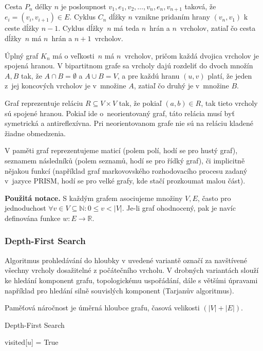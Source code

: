 Cesta $P_n$ délky $n$ je posloupnost $v_1,e_1,v_2,\ldots,v_n,e_n,v_{n+1}$ 
taková, že $e_i = (v_i, v_{i+1}) \in E$. Cyklus $C_n$ dĺžky $n$ vznikne
pridaním hrany $(v_n, v_1)$ k ceste dĺžky $n-1$. Cyklus dĺžky~$n$ má 
teda $n$~hrán a $n$~vrcholov, zatiaľ čo cesta dĺžky~$n$ má $n$~hrán a $n+1$~vrcholov.

Úplný graf $K_n$ má o veľkosti~$n$ má $n$~vrcholov, pričom každá dvojica
vrcholov je spojená hranou. V bipartitnom grafe sa vrcholy dajú
rozdeliť do dvoch množín $A,B$ tak, že $A \cap B = \emptyset$ a 
$A \cup B = V$, a pre každú hranu $(u,v)$ platí, že jeden z~jej
koncových vrcholov je v~množine $A$, zatiaľ čo druhý je v~množine $B$.

Graf reprezentuje reláciu $R \subseteq V \times V$ tak, že pokiaľ
$(a,b) \in R$, tak tieto vrcholy sú spojené hranou. Pokiaľ ide 
o~neorientovaný graf, táto relácia musí byť symetrická a antireflexívna.
Pri neorientovanom grafe nie sú na reláciu kladené žiadne obmedzenia.

V paměti graf reprezentujeme maticí (polem polí, hodí se pro hustý
graf), seznamem následníků (polem seznamů, hodí se pro řídký graf), či
implicitně nějakou funkcí (například graf markovovského rozhodovacího
procesu zadaný v~jazyce PRISM, hodí se pro velké grafy, kde stačí
prozkoumat malou část).

\bigskip
\noindent
\textbf{Použitá notace.} S každým grafem asociujeme množiny $V, E$,
často pro jednoduchost
$\forall v \in V \subseteq \mathbb{N} : 0 \leq v < \lvert V \rvert$.
Je-li graf ohodnocený, pak je navíc definována funkce $w : E \to
\mathbb{R}$.

\subsubsection*{Depth-First Search}

Algoritmus prohledávání do hloubky v uvedené variantě označí za
navštívené všechny vrcholy dosažitelné z počátečního vrcholu. V drobných
variantách slouží ke hledání komponent grafu, topologickému uspořádání,
dále s většími úpravami například pro hledání silně souvislých komponent
(Tarjanův algoritmus).

Paměťová náročnost je úměrná hloubce grafu, časová velikosti
$(\lvert V \rvert + \lvert E \rvert)$.

\begin{algorithm}
\caption{Depth-First Search}
\begin{algorithmic}[1]
    \State visited[$u$] = True
            \State {}
        \EndIf
    \EndFor
\EndFunction
\end{algorithmic}
\end{algorithm}

